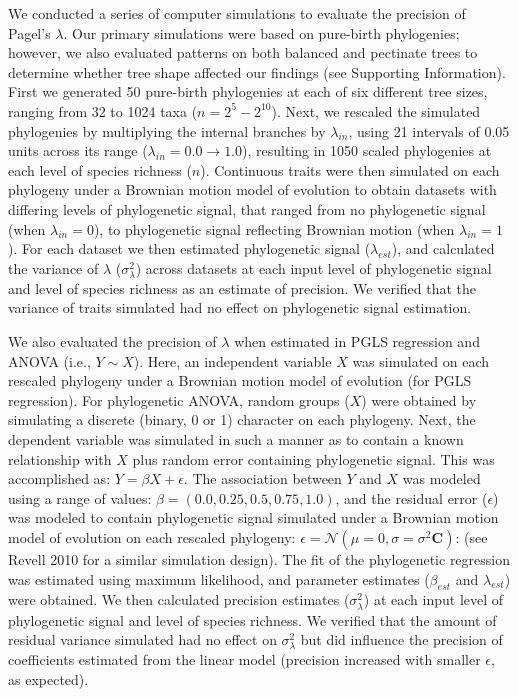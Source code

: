 \documentclass[]{article}
\begin{document}
We conducted a series of computer simulations to evaluate the precision
of Pagel's \(\lambda\). Our primary simulations were based on pure-birth
phylogenies; however, we also evaluated patterns on both balanced and
pectinate trees to determine whether tree shape affected our findings
(see Supporting Information). First we generated 50 pure-birth
phylogenies at each of six different tree sizes, ranging from 32 to 1024
taxa (\(n=2^5 - 2^{10}\)). Next, we rescaled the simulated phylogenies
by multiplying the internal branches by \(\lambda_{in}\), using 21
intervals of 0.05 units across its range
(\(\lambda_{in} = 0.0 \to 1.0\)), resulting in 1050 scaled phylogenies
at each level of species richness (\(n\)). Continuous traits were then
simulated on each phylogeny under a Brownian motion model of evolution
to obtain datasets with differing levels of phylogenetic signal, that
ranged from no phylogenetic signal (when \(\lambda_{in} =0\)), to
phylogenetic signal reflecting Brownian motion (when
\(\lambda_{in} =1\)). For each dataset we then estimated phylogenetic
signal (\(\lambda_{est}\)), and calculated the variance of \(\lambda\)
(\(\sigma^2_\lambda\)) across datasets at each input level of
phylogenetic signal and level of species richness as an estimate of
precision. We verified that the variance of traits simulated had no
effect on phylogenetic signal estimation. \hfill\break

We also evaluated the precision of \(\lambda\) when estimated in PGLS
regression and ANOVA (i.e., \(Y\sim{X}\)). Here, an independent variable
\(X\) was simulated on each rescaled phylogeny under a Brownian motion
model of evolution (for PGLS regression). For phylogenetic ANOVA, random
groups (\(X\)) were obtained by simulating a discrete (binary, 0 or 1)
character on each phylogeny. Next, the dependent variable was simulated
in such a manner as to contain a known relationship with \(X\) plus
random error containing phylogenetic signal. This was accomplished as:
\(Y=\beta{X}+\epsilon\). The association between \(Y\) and \(X\) was
modeled using a range of values: \(\beta=(0.0,0.25, 0.5, 0.75,1.0)\),
and the residual error (\(\epsilon\)) was modeled to contain
phylogenetic signal simulated under a Brownian motion model of evolution
on each rescaled phylogeny:
\(\epsilon=\mathcal{N}(\mu=0,\sigma=\sigma^2\mathbf{C})\): (see Revell
2010 for a similar simulation design). The fit of the phylogenetic
regression was estimated using maximum likelihood, and parameter
estimates (\(\beta_{est}\) and \(\lambda_{est}\)) were obtained. We then
calculated precision estimates (\(\sigma^2_\lambda\)) at each input
level of phylogenetic signal and level of species richness. We verified
that the amount of residual variance simulated had no effect on
\(\sigma^2_\lambda\) but did influence the precision of coefficients
estimated from the linear model (precision increased with smaller
\(\epsilon\), as expected). \hfill\break
\end{document}
